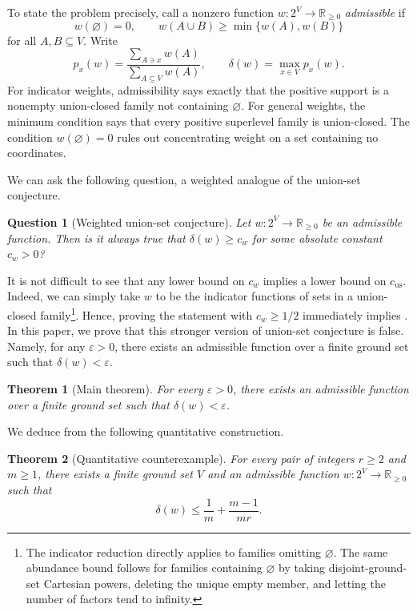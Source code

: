 \documentclass[11pt]{article}
\newtheorem{theorem}{Theorem}[section]
\newtheorem{question}[question]{Question}
\renewcommand{\epsilon}{\varepsilon}
\newcommand{\rr}{\mathbb{R}}
\newcommand{\<}{\langle}
\renewcommand{\>}{\rangle}
\numberwithin{equation}{section}
\begin{document}
To state the problem precisely, call a nonzero function
$w:2^V\to\rr_{\ge0}$ \emph{admissible} if
\begin{equation}\label{eq:admissible}
 w(\varnothing)=0,\qquad
 w(A\cup B)\ge\min\{w(A),w(B)\}
\end{equation}
for all $A, B \subseteq V$.
Write
\[
 p_x(w)=\frac{\sum_{A\ni x}w(A)}{\sum_{A \subseteq V}w(A)},\qquad
 \delta(w)=\max_{x\in V}p_x(w).
\]
For indicator weights, admissibility says exactly that the positive support
is a nonempty union-closed family not containing $\varnothing$. For general
weights, the minimum condition says that every positive superlevel family is
union-closed. The condition $w(\varnothing)=0$ rules out concentrating weight
on a set containing no coordinates.

We can ask the following question, a weighted analogue of the union-set conjecture. 

\begin{question}[Weighted union-set conjecture]
    Let $w: 2^V \to \rr_{\geq 0}$ be an admissible function. Then is it always true that $\delta (w) \geq c_w$ for some absolute constant $c_w > 0$?
\end{question}

 It is not difficult to see that any lower bound on $c_{w}$ implies a lower bound on $c_{\mathrm{us}}$. Indeed, we can simply take $w$ to be the indicator functions of sets in a union-closed family\footnote{The indicator reduction directly applies to families omitting \(\varnothing\). The same abundance bound follows for families containing \(\varnothing\) by taking disjoint-ground-set Cartesian powers, deleting the unique empty member, and letting the number of factors tend to infinity.}. Hence, proving the statement with $c_w \geq 1/2$ immediately implies .  In this paper, we prove that this stronger version of union-set conjecture is false. Namely, for any $\epsilon > 0$, there exists an admissible function over a finite ground set such that $\delta (w) < \epsilon$.

 \begin{theorem}[Main theorem]\label{thm:main}
     For every $\varepsilon>0$, there exists an admissible function over a finite ground set such that $\delta (w) < \epsilon$.
 \end{theorem}
We deduce  from the following quantitative construction.

\begin{theorem}[Quantitative counterexample]\label{thm:example}
For every pair of integers $r\ge2$ and $m\ge1$, there exists a finite ground set
$V$ and an admissible function $w:2^V\to\rr_{\ge0}$ such that
\begin{equation}\label{eq:main} \delta(w)\le\frac1m+\frac{m-1}{mr}.
\end{equation}
\end{theorem}
\end{document}
